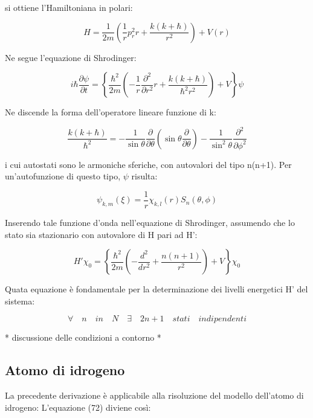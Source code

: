\documentclass{report}
\begin{document}
si ottiene l'Hamiltoniana in polari:

\begin{equation}
  H=\frac{1}{2m}\left ( \frac{1}{r}p_r^2 r +\frac{k(k+\hbar)}{r^2}\right )+V(r)
\end{equation}

Ne segue l'equazione di Shrodinger:

\begin{equation}
  i\hbar \frac{\partial \psi}{\partial t}= \left \{ \frac{\hbar^2}{2m}\left ( -\frac{1}{r}\frac{\partial^2}{\partial r^2}r+\frac{k(k+\hbar)}{\hbar^2r^2} \right ) +V \right \} \psi
\end{equation}

Ne discende la forma dell'operatore lineare funzione di k:

\begin{equation}
  \frac{k(k+\hbar)}{\hbar^2}= -\frac{1}{\sin{\theta}}\frac{\partial}{\partial \theta}\left ( \sin{\theta}\frac{\partial}{\partial \theta} \right ) - \frac{1}{\sin^2{\theta}}\frac{\partial^2}{\partial \phi^2}
\end{equation}

i cui autostati sono le armoniche sferiche, con autovalori del tipo n(n+1). Per un'autofunzione di questo tipo, $\psi$ risulta:

\begin{equation}
  \psi_{k,m}(\xi)=\frac{1}{r}\chi_{k,l}(r)S_n(\theta, \phi)
\end{equation}

Inserendo tale funzione d'onda nell'equazione di Shrodinger, assumendo che lo stato sia stazionario con autovalore di H pari ad H':

\begin{equation}
  H' \chi_0=\left\{\frac{\hbar^2}{2m}\left( -\frac{d^2}{dr^2}+\frac{n(n+1)}{r^2}\right)+V \right\}\chi_0
\end{equation}

Quata equazione è fondamentale per la determinazione dei livelli energetici H' del sistema:

\begin{equation}
  \forall \quad n \quad in \quad N \quad \exists \quad 2n+1 \quad stati \quad indipendenti
\end{equation}


* discussione delle condizioni a contorno *

\subsection{Atomo di idrogeno}
La precedente derivazione è applicabile alla risoluzione del modello dell'atomo di idrogeno:
L'equazione (72) diviene così:
\end{document}
